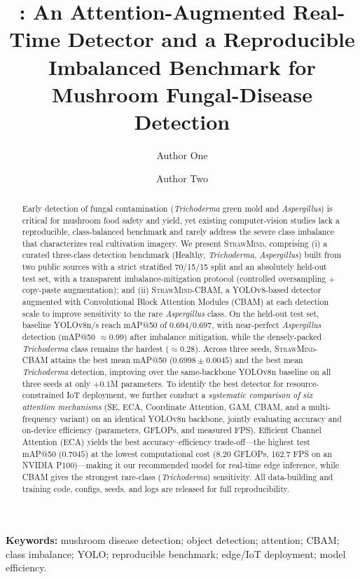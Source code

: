 \documentclass[11pt]{article}
\title{\sm: An Attention-Augmented Real-Time Detector and a Reproducible Imbalanced Benchmark for Mushroom Fungal-Disease Detection}
\author[1]{Author One}
\author[1]{Author Two}
\affil[1]{Affiliation, City, Country. \texttt{\{a1,a2\}@inst.edu}}
\date{}
\newcommand{\sm}{\textsc{StrawMind}}
\newcommand{\smc}{\textsc{StrawMind-CBAM}}
\begin{document}
\maketitle

\begin{abstract}
Early detection of fungal contamination (\emph{Trichoderma} green mold and \emph{Aspergillus})
is critical for mushroom food safety and yield, yet existing computer-vision studies lack a
reproducible, class-balanced benchmark and rarely address the severe class imbalance that
characterizes real cultivation imagery. We present \sm, comprising (i) a curated three-class
detection benchmark (Healthy, \emph{Trichoderma}, \emph{Aspergillus}) built from two public
sources with a strict stratified 70/15/15 split and an absolutely held-out test set, with a
transparent imbalance-mitigation protocol (controlled oversampling + copy-paste augmentation);
and (ii) \smc, a YOLOv8-based detector augmented with Convolutional Block Attention Modules
(CBAM) at each detection scale to improve sensitivity to the rare \emph{Aspergillus} class.
On the held-out test set, baseline YOLOv8n/s reach mAP@50 of $0.694/0.697$, with near-perfect
\emph{Aspergillus} detection (mAP@50 $\approx 0.99$) after imbalance mitigation, while the
densely-packed \emph{Trichoderma} class remains the hardest ($\approx 0.28$). Across three seeds, \smc{} attains the best mean mAP@50 ($0.6998\pm0.0045$) and the best mean
\emph{Trichoderma} detection, improving over the same-backbone YOLOv8n baseline on all three seeds
at only $+0.1$M parameters. To identify the best detector for resource-constrained IoT deployment, we further conduct a \emph{systematic comparison of six attention mechanisms} (SE, ECA, Coordinate Attention, GAM, CBAM, and a multi-frequency variant) on an identical YOLOv8n backbone, jointly evaluating accuracy and on-device efficiency (parameters, GFLOPs, and measured FPS). Efficient Channel Attention (ECA) yields the best accuracy--efficiency trade-off---the highest test mAP@50 ($0.7045$) at the lowest computational cost ($8.20$ GFLOPs, $162.7$ FPS on an NVIDIA P100)---making it our recommended model for real-time edge inference, while CBAM gives the strongest rare-class (\emph{Trichoderma}) sensitivity. All data-building and training code, configs,
seeds, and logs are released for full reproducibility.
\end{abstract}

\textbf{Keywords:} mushroom disease detection; object detection; attention; CBAM; class imbalance; YOLO; reproducible benchmark; edge/IoT deployment; model efficiency.
\end{document}
